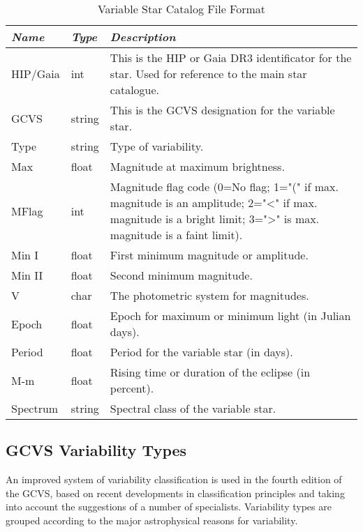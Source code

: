 \begin{table}[tb]
\begin{tabularx}{\textwidth}{l|l|X}\toprule
\emph{Name} & \emph{Type} & \emph{Description}\\\midrule
HIP/Gaia & int    & This is the HIP or Gaia DR3 identificator for the star. Used for reference to the main star catalogue.\\%
GCVS     & string & This is the GCVS designation for the variable star.\\%
Type     & string & Type of variability.\\%
Max      & float  & Magnitude at maximum brightness.\\%
MFlag    & int    & Magnitude flag code (0=No flag; 1="(" if max. magnitude is an amplitude; 
                    2="\textless{}" if max. magnitude is a bright limit; 
                    3="\textgreater{}" is max. magnitude is a faint limit).\\%
Min I    & float  & First minimum magnitude or amplitude.\\%
Min II   & float  & Second minimum magnitude.\\%
V        & char   & The photometric system for magnitudes.\\%
Epoch    & float  & Epoch for maximum or minimum light (in Julian days).\\%
Period   & float  & Period for the variable star (in days).\\%
M-m      & float  & Rising time or duration of the eclipse (in percent).\\%
Spectrum & string & Spectral class of the variable star.\\\bottomrule
\end{tabularx}
\caption{Variable Star Catalog File Format}
\label{tab:sec:StarCatalogues:VariableStars}
\end{table}

\subsection{GCVS Variability Types}\label{gcvs-variability-types}

An improved system of variability classification is used in the fourth
edition of the GCVS, based on recent developments in classification
principles and taking into account the suggestions of a number of
specialists. Variability types are grouped according to the major
astrophysical reasons for variability.

